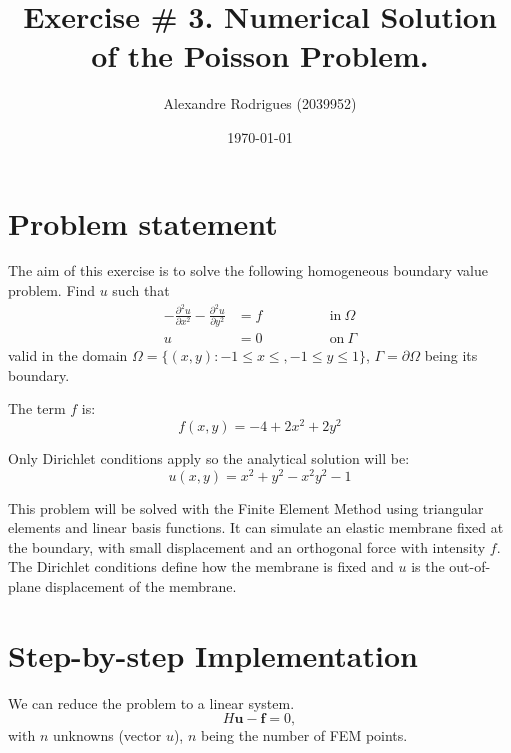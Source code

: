 \documentclass[a4paper, 11pt]{article}
\begin{document}
	
	\title{Exercise \# 3. Numerical Solution of the Poisson Problem. }
	\author{{\small Alexandre Rodrigues (2039952)}}
	\date{\today}
	
	\maketitle
		\section{Problem statement}
			The aim of this exercise is to solve the following homogeneous boundary value problem.
			Find $u$ such that 
			\begin{align}
				-\frac{\partial^2 u}{\partial x^2} -\frac{\partial^2 u}{\partial y^2} &= f \qquad \qquad &\text{in} \ \Omega \\
				u &= 0 \qquad \qquad & \text{on} \ \Gamma
				\label{eq:prob}
			\end{align}
			valid in the domain $ \Omega = \{ (x,y) : -1 \le x \le , -1 \le y \le 1\} $, $\Gamma = \partial \Omega$ being its boundary.
			
			The term $f$ is:
			\begin{equation}
				f(x,y) = -4 + 2 x^2 + 2 y^2
				\label{eq:f}
			\end{equation}
		
			Only Dirichlet conditions apply so the analytical solution will be:
			\begin{equation}
				u(x,y) = x^2 + y^2 - x^2 y^2 -1
				\label{eq:analytic}
			\end{equation}
		
			This problem will be solved with the Finite Element Method using triangular elements and linear basis functions.
			It can simulate an elastic membrane fixed at the boundary, with small displacement and an orthogonal force with intensity $ f $.
			The Dirichlet conditions define how the membrane is fixed and $u$ is the out-of-plane displacement of the membrane.
			
			\section{Step-by-step Implementation}
				We can reduce the problem to a linear system.
				\begin{equation}
					H \mathbf{u} - \mathbf{f} = 0,
				\end{equation}
				with $ n $ unknowns (vector $ u $), $ n $ being the number of FEM points.
			
\end{document}
